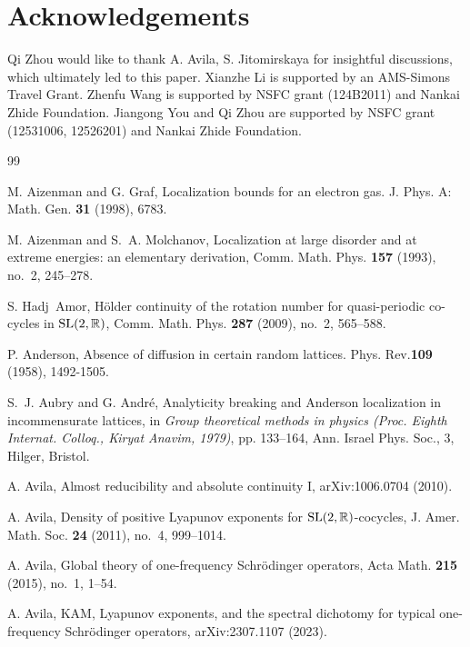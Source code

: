 \documentclass[reqno,11pt]{amsart}
\newcommand{\R}{{\mathbb R}}
\begin{document}
\section*{Acknowledgements} 
Qi Zhou would like to thank A. Avila, S. Jitomirskaya  for insightful discussions, which ultimately led  to this paper. 
Xianzhe Li is supported by an AMS-Simons Travel Grant.
 Zhenfu Wang is supported by NSFC grant (124B2011) and Nankai Zhide Foundation. Jiangong You and  Qi Zhou are supported by NSFC grant (12531006, 12526201) and Nankai Zhide Foundation. 



\begin{thebibliography}{99}

 M. Aizenman and G. Graf, Localization bounds for an electron gas.  J. Phys. A: Math. Gen. {\bf31} (1998), 6783.

M. Aizenman and S.~A. Molchanov, Localization at large disorder and at extreme energies: an elementary derivation, Comm. Math. Phys. {\bf 157} (1993), no.~2, 245--278.


S. Hadj~Amor, H\"older continuity of the rotation number for quasi-periodic co-cycles in ${\rm SL}(2,\R)$, Comm. Math. Phys. {\bf 287} (2009), no.~2, 565--588.

 P. Anderson, Absence of diffusion in certain random lattices.  Phys. Rev.{\bf109} (1958), 1492-1505.

S.~J. Aubry and G. Andr\'e, Analyticity breaking and Anderson localization in incommensurate lattices, in {\it Group theoretical methods in physics (Proc. Eighth Internat. Colloq., Kiryat Anavim, 1979)}, pp. 133--164, Ann. Israel Phys. Soc., 3, Hilger, Bristol.




A. Avila, Almost reducibility and absolute continuity I, arXiv:1006.0704 (2010).


A. Avila, Density of positive Lyapunov exponents for ${\rm SL}(2,\mathbb{R})$-cocycles, J. Amer. Math. Soc. {\bf 24} (2011), no.~4, 999--1014.



	A. Avila, Global theory of one-frequency Schr\"odinger operators, Acta Math. {\bf 215} (2015), no.~1, 1--54.
    
A. Avila, KAM, Lyapunov exponents, and the spectral dichotomy for typical one-frequency Schr\"{o}dinger operators,  arXiv:2307.1107 (2023).	


\end{thebibliography}
\end{document}
